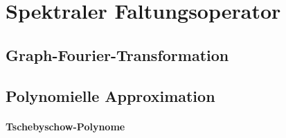 \section{Spektraler Faltungsoperator}
\label{spektraler_faltungsoperator}

\subsection{Graph-Fourier-Transformation}
\label{graph_fourier_transformation}

\subsection{Polynomielle Approximation}
\label{polynomielle_approximation}

\paragraph{Tschebyschow-Polynome}
\label{tschebyschow_polynome}
